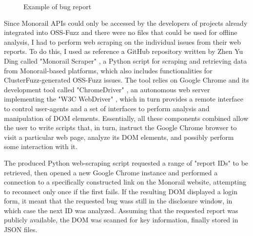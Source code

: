 \begin{figure}[h]
\caption{Example of bug report \cite{ossfuzz_bugtracker}}
\label{fig:issue}
\end{figure}

Since Monorail APIs could only be accessed by the developers of projects already integrated into OSS-Fuzz and there were no files that could be used for offline analysis, I had to perform web scraping on the individual issues from their web reports. To do this, I used as reference a GitHub repository written by Zhen Yu Ding called "Monorail Scraper" \cite{scraper}, a Python script for scraping and retrieving data from Monorail-based platforms, which also includes functionalities for ClusterFuzz-generated OSS-Fuzz issues. The tool relies on Google Chrome and its development tool called "ChromeDriver" \cite{driver}, an autonomous web server implementing the "W3C WebDriver" \cite{driver_standard}, which in turn provides a remote interface to control user-agents and a set of interfaces to perform analysis and manipulation of DOM elements. Essentially, all these components combined allow the user to write scripts that, in turn, instruct the Google Chrome browser to visit a particular web page, analyze its DOM elements, and possibly perform some interaction with it.


\newpage
The produced Python web-scraping script requested a range of "report IDs" to be retrieved, then opened a new Google Chrome instance and performed a connection to a specifically constructed link on the Monorail website, attempting to reconnect only once if the first fails. If the resulting DOM displayed a login form, it meant that the requested bug wass still in the disclosure window, in which case the next ID was analyzed. Assuming that the requested report was publicly available, the DOM was scanned for key information, finally stored in JSON files. 
\newline

